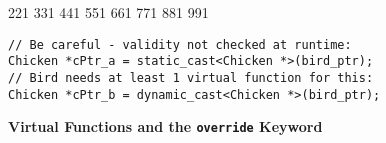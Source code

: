 \documentclass[7pt, twocolumn]{extarticle}
\newcommand{\myinline}[1]{\lstinline[basicstyle={\fontsize{5pt}{6}\ttfamily}]{#1}}
\newcommand{\myinlinewhite}[1]{\lstinline[deletekeywords = {const,override},keywordstyle=\color{white},basicstyle={\ttfamily}]{#1}}
\begin{document}
\begin{small}
\begin{minipage}[h]{5.7cm}
\begin{tcolorbox}[top=-5pt,bottom=-5pt,left=-1pt,right=-1pt,boxrule=0.5pt,arc=0pt]
{{    {2}{{{\color{vscode_green!100!black}2}}}1
    {3}{{{\color{vscode_green!100!black}3}}}1
    {4}{{{\color{vscode_green!100!black}4}}}1
    {5}{{{\color{vscode_green!100!black}5}}}1
    {6}{{{\color{vscode_green!100!black}6}}}1
    {7}{{{\color{vscode_green!100!black}7}}}1
    {8}{{{\color{vscode_green!100!black}8}}}1
    {9}{{{\color{vscode_green!100!black}9}}}1
}
\begin{lstlisting}[style = mystyle]
// Be careful - validity not checked at runtime:
Chicken *cPtr_a = static_cast<Chicken *>(bird_ptr);
// Bird needs at least 1 virtual function for this:
Chicken *cPtr_b = dynamic_cast<Chicken *>(bird_ptr);
\end{lstlisting}
}
\end{tcolorbox}
\end{minipage}






\smallskip
\begin{minipage}[c]{4.9cm}
      \small \textcolor{headcolor}{\textbf{Virtual Functions and the \myinlinewhite{override} Keyword}}
      

\end{minipage}
\end{small}
\end{document}

